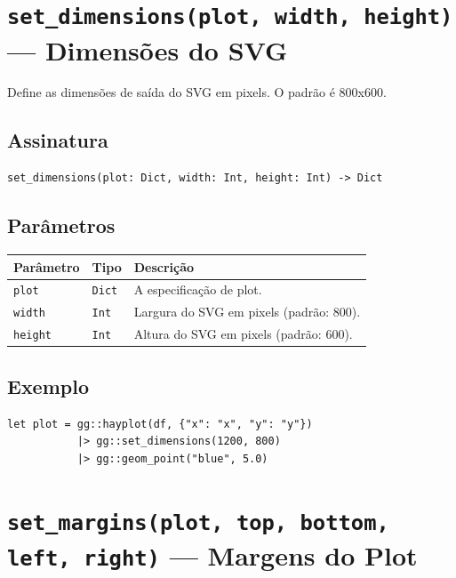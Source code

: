 \documentclass[12pt, a4paper, oneside]{book}
\newcommand{\code}[1]{\texttt{#1}}
\begin{document}
\section{\texttt{set\_dimensions(plot, width, height)} --- Dimensões do SVG}

Define as dimensões de saída do SVG em pixels. O padrão é 800x600.

\subsection*{Assinatura}

\begin{lstlisting}[style=inline]
set_dimensions(plot: Dict, width: Int, height: Int) -> Dict
\end{lstlisting}

\subsection*{Parâmetros}

\begin{tabularx}{\textwidth}{@{}lL{2.5cm}X@{}}
  \toprule
  \textbf{Parâmetro} & \textbf{Tipo} & \textbf{Descrição} \\
  \midrule
  \code{plot}    & \code{Dict}   & A especificação de plot. \\[4pt]
  \code{width}   & \code{Int}    & Largura do SVG em pixels (padrão: 800). \\[4pt]
  \code{height}  & \code{Int}    & Altura do SVG em pixels (padrão: 600). \\
  \bottomrule
\end{tabularx}

\subsection*{Exemplo}

\begin{lstlisting}[caption={Dimensões customizadas}]
let plot = gg::hayplot(df, {"x": "x", "y": "y"})
           |> gg::set_dimensions(1200, 800)
           |> gg::geom_point("blue", 5.0)
\end{lstlisting}

\section{\texttt{set\_margins(plot, top, bottom, left, right)} --- Margens do Plot}
\end{document}
